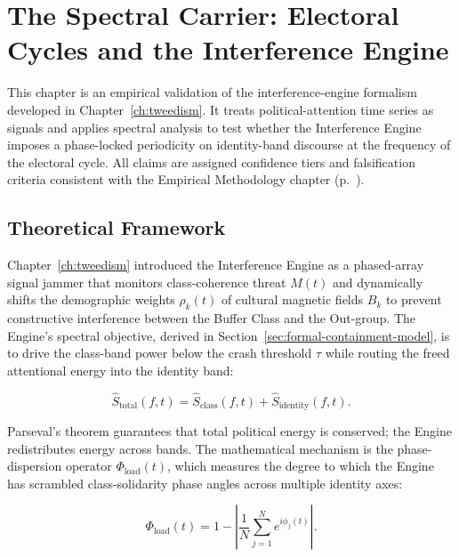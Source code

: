 \chapter{The Spectral Carrier: Electoral Cycles and the Interference Engine}
\label{ch:spectral_carrier}

\begin{definition}
This chapter is an empirical validation of the interference-engine formalism developed in Chapter~\ref{ch:tweedism}. It treats political-attention time series as signals and applies spectral analysis to test whether the Interference Engine imposes a phase-locked periodicity on identity-band discourse at the frequency of the electoral cycle. All claims are assigned confidence tiers and falsification criteria consistent with the Empirical Methodology chapter (p.~\pageref{ch:empirical_methodology}).
\end{definition}

\section{Theoretical Framework}

Chapter~\ref{ch:tweedism} introduced the Interference Engine as a phased-array signal jammer that monitors class-coherence threat $M(t)$ and dynamically shifts the demographic weights $\rho_k(t)$ of cultural magnetic fields $B_k$ to prevent constructive interference between the Buffer Class and the Out-group. The Engine's spectral objective, derived in Section~\ref{sec:formal-containment-model}, is to drive the class-band power below the crash threshold $\tau$ while routing the freed attentional energy into the identity band:

\begin{equation}\label{eq:21.1-interference-spectral-form}
\hat{S}_{\text{total}}(f,t) = \hat{S}_{\text{class}}(f,t) + \hat{S}_{\text{identity}}(f,t).
\end{equation}

Parseval's theorem guarantees that total political energy is conserved; the Engine redistributes energy across bands. The mathematical mechanism is the phase-dispersion operator $\Phi_{\text{load}}(t)$, which measures the degree to which the Engine has scrambled class-solidarity phase angles across multiple identity axes:

\begin{equation}\label{eq:21.2-phase-dispersion}
\Phi_{\text{load}}(t) = 1 - \left| \frac{1}{N} \sum_{j=1}^{N} e^{i\phi_j(t)} \right|.
\end{equation}

